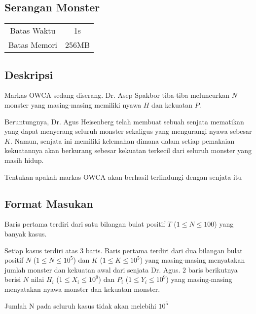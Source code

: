 \documentclass{article}
\begin{document}
\begin{center}

    
    \section*{Serangan Monster} %

    \begin{tabular}{ | c c | }
        \hline
        Batas Waktu  & 1s \\    %
        Batas Memori & 256MB \\  %
        \hline
    \end{tabular}
\end{center}

\subsection*{Deskripsi}

Markas OWCA sedang diserang. Dr. Asep Spakbor tiba-tiba meluncurkan $N$ monster yang masing-masing memiliki nyawa $H$ dan kekuatan $P$.

Beruntungnya, Dr. Agus Heisenberg telah membuat sebuah senjata mematikan yang dapat menyerang seluruh monster sekaligus yang mengurangi nyawa sebesar $K$. Namun, senjata ini memiliki kelemahan dimana dalam setiap pemakaian kekuatannya akan berkurang sebesar kekuatan terkecil dari seluruh monster yang masih hidup.

Tentukan apakah markas OWCA akan berhasil terlindungi dengan senjata itu

\subsection*{Format Masukan}

Baris pertama terdiri dari satu bilangan bulat positif $T$ ($1 \leq N \leq 100$)  yang banyak kasus.

Setiap kasus terdiri atas 3 baris. Baris pertama terdiri dari dua bilangan bulat positif $N$ ($1 \leq N \leq 10^{5}$) dan $K$ ($1 \leq K \leq 10^{5}$) yang masing-masing menyatakan jumlah monster dan kekuatan awal dari senjata Dr. Agus.
$2$ baris berikutnya berisi $N$ nilai $H_i$ ($1 \leq X_i \leq 10^{9}$) dan $P_i$ ($1 \leq Y_i \leq 10^{9}$) yang masing-masing menyatakan nyawa monster dan kekuatan monster.

Jumlah N pada seluruh kasus tidak akan melebihi $10^5$
\end{document}
